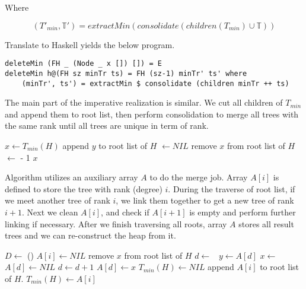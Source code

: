 \documentclass{article}
\begin{document}
Where

\[
  (T'_{min}, \mathbb{T}') = extractMin(consolidate(children(T_{min}) \cup \mathbb{T}))
\]

Translate to Haskell yields the below program.

\lstset{language=Haskell}
\begin{lstlisting}
deleteMin (FH _ (Node _ x []) []) = E
deleteMin h@(FH sz minTr ts) = FH (sz-1) minTr' ts' where
    (minTr', ts') = extractMin $ consolidate (children minTr ++ ts)
\end{lstlisting} %

The main part of the imperative realization is similar. We cut all children of
$T_{min}$ and append them to root list, then perform consolidation to merge
all trees with the same rank until all trees are unique in term of rank.

\begin{algorithmic}[1]
  \State $x \gets T_{min}(H)$
      \State append $y$ to root list of $H$
      \State {} $\gets NIL$
    \EndFor
    \State remove $x$ from root list of $H$
    \State {} $\gets$  - 1
    \State {}
  \EndIf
  \State \Return $x$
\EndFunction
\end{algorithmic}

Algorithm  utilizes an auxiliary array $A$ to do the
merge job. Array $A[i]$ is defined to store the tree with rank (degree) $i$.
During the traverse of root list, if we meet another tree of rank $i$, we
link them together to get a new tree of rank $i+1$. Next we clean $A[i]$,
and check if $A[i+1]$ is empty and perform further linking if necessary.
After we finish traversing all roots, array $A$ stores all result trees
and we can re-construct the heap from it.

\begin{algorithmic}[1]
  \State $D \gets $ ()
    \State $A[i] \gets NIL$
  \EndFor
    \State remove $x$ from root list of $H$
    \State $d \gets $ 
    \
      \State $y \gets A[d]$
      \State $x \gets $ 
      \State $A[d] \gets NIL$
      \State $d \gets d + 1$
    \EndWhile
    \State $A[d] \gets x$
  \EndFor
  \State $T_{min}(H) \gets NIL$ 
  \For{$i \gets 0$ to $D$}
      \State append $A[i]$ to root list of $H$.
        \State $T_{min}(H) \gets A[i]$
      \EndIf
    \EndIf
  \EndFor
\EndFunction
\end{algorithmic}
\end{document}
